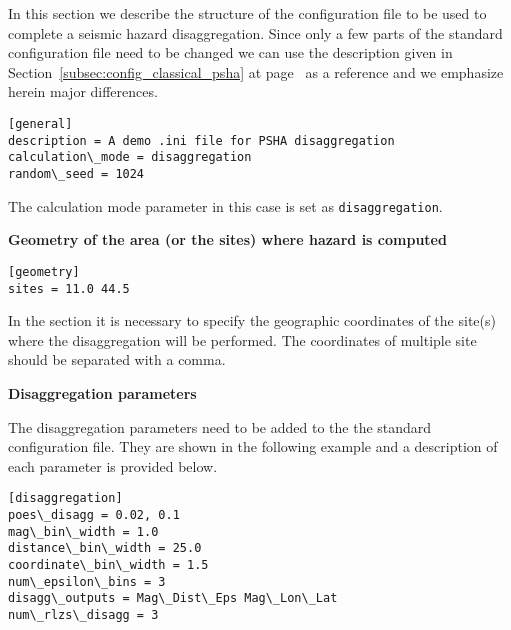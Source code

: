 In this section we describe the structure of the configuration file to be used
to complete a seismic hazard disaggregation. Since only a few parts of the
standard configuration file need to be changed we can use the description
given in Section~\ref{subsec:config_classical_psha} at
page~\pageref{subsec:config_classical_psha} as a reference and we emphasize
herein major differences.

\begin{verbatim}
[general]
description = A demo .ini file for PSHA disaggregation
calculation\_mode = disaggregation
random\_seed = 1024
\end{verbatim}

The calculation mode parameter in this case is set as
\texttt{disaggregation}.

\textbf{Geometry of the area (or the sites) where hazard is computed}

\begin{verbatim}
[geometry]
sites = 11.0 44.5
\end{verbatim}

In the section it is necessary to specify the geographic coordinates of
the site(s) where the disaggregation will be performed. The coordinates
of multiple site should be separated with a comma.

\textbf{Disaggregation parameters}

The disaggregation parameters need to be added to the the standard
configuration file. They are shown in the following example and a description
of each parameter is provided below.

\begin{verbatim}
[disaggregation]
poes\_disagg = 0.02, 0.1
mag\_bin\_width = 1.0
distance\_bin\_width = 25.0
coordinate\_bin\_width = 1.5
num\_epsilon\_bins = 3
disagg\_outputs = Mag\_Dist\_Eps Mag\_Lon\_Lat
num\_rlzs\_disagg = 3
\end{verbatim}

